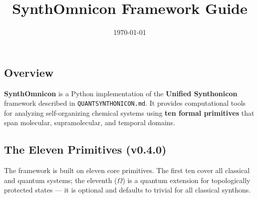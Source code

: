 \documentclass[12pt,a4paper]{article}
\begin{document}
\title{SynthOmnicon Framework Guide}
\date{\today}

\maketitle

\subsection{Overview}

\textbf{SynthOmnicon} is a Python implementation of the \textbf{Unified Synthonicon} framework described in \texttt{QUANTSYNTHONICON.md}. It provides computational tools for analyzing self-organizing chemical systems using \textbf{ten formal primitives} that span molecular, supramolecular, and temporal domains.

\subsection{The Eleven Primitives (v0.4.0)}

The framework is built on eleven core primitives. The first ten cover all classical and quantum systems; the eleventh ($\Omega$) is a quantum extension for topologically protected states --- it is optional and defaults to trivial for all classical synthons.
\end{document}
